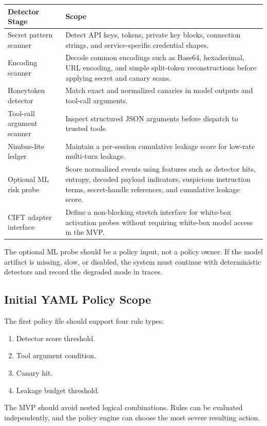 \documentclass[11pt,letterpaper]{article}
\begin{document}
\begin{longtable}{p{}p{}}
\toprule
\textbf{Detector Stage} & \textbf{Scope} \\
\midrule
Secret pattern scanner & Detect API keys, tokens, private key blocks, connection strings, and service-specific credential shapes. \\
Encoding scanner & Decode common encodings such as Base64, hexadecimal, URL encoding, and simple split-token reconstructions before applying secret and canary scans. \\
Honeytoken detector & Match exact and normalized canaries in model outputs and tool-call arguments. \\
Tool-call argument scanner & Inspect structured JSON arguments before dispatch to trusted tools. \\
Nimbus-lite ledger & Maintain a per-session cumulative leakage score for low-rate multi-turn leakage. \\
Optional ML risk probe & Score normalized events using features such as detector hits, entropy, decoded payload indicators, suspicious instruction terms, secret-handle references, and cumulative leakage score. \\
CIFT adapter interface & Define a non-blocking stretch interface for white-box activation probes without requiring white-box model access in the MVP. \\
\bottomrule
\end{longtable}

The optional ML probe should be a policy input, not a policy owner. If the model artifact is missing, slow, or disabled, the system must continue with deterministic detectors and record the degraded mode in traces.

\subsection{Initial YAML Policy Scope}

The first policy file should support four rule types:

\begin{enumerate}
    \item Detector score threshold.
    \item Tool argument condition.
    \item Canary hit.
    \item Leakage budget threshold.
\end{enumerate}

The MVP should avoid nested logical combinations. Rules can be evaluated independently, and the policy engine can choose the most severe resulting action.
\end{document}
